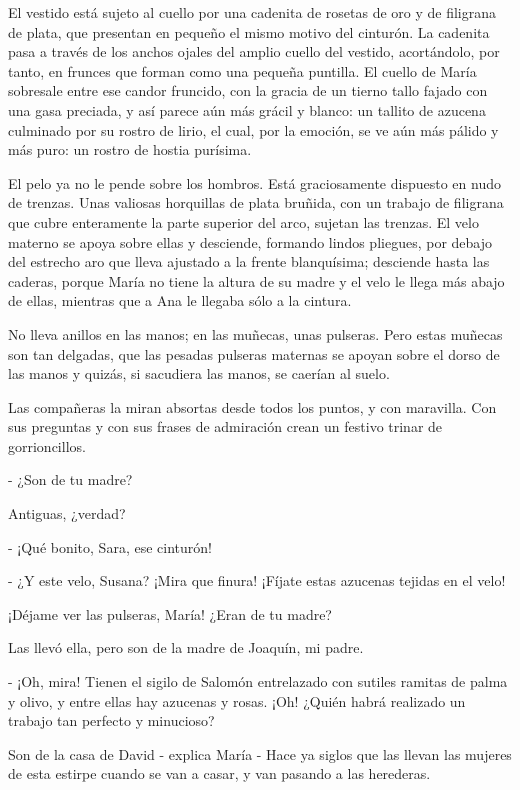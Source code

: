 \documentclass[12pt, twoside, openright]{book} %
\begin{document}
El vestido está sujeto al cuello por una cadenita de rosetas de oro y de filigrana de plata, que presentan en pequeño el mismo motivo del cinturón. La cadenita pasa a través de los anchos ojales del amplio cuello del vestido, acortándolo, por tanto, en frunces que forman como una pequeña puntilla. El cuello de María sobresale entre ese candor fruncido, con la gracia de un tierno tallo fajado con una gasa preciada, y así parece aún más grácil y blanco: un tallito de azucena culminado por su rostro de lirio, el cual, por la emoción, se ve aún más pálido y más puro: un rostro de hostia purísima. 

El pelo ya no le pende sobre los hombros. Está graciosamente dispuesto en nudo de trenzas. Unas valiosas horquillas de plata bruñida, con un trabajo de filigrana que cubre enteramente la parte superior del arco, sujetan las trenzas. El velo materno se apoya sobre ellas y desciende, formando lindos pliegues, por debajo del estrecho aro que lleva ajustado a la frente blanquísima; desciende hasta las caderas, porque María no tiene la altura de su madre y el velo le llega más abajo de ellas, mientras que a Ana le llegaba sólo a la cintura. 

No lleva anillos en las manos; en las muñecas, unas pulseras. Pero estas muñecas son tan delgadas, que las pesadas pulseras maternas se apoyan sobre el dorso de las manos y quizás, si sacudiera las manos, se caerían al suelo. 

Las compañeras la miran absortas desde todos los puntos, y con maravilla. Con sus preguntas y con sus frases de admiración crean un festivo trinar de gorrioncillos. 

- ¿Son de tu madre? 

Antiguas, ¿verdad? 

- ¡Qué bonito, Sara, ese cinturón! 

- ¿Y este velo, Susana? ¡Mira que finura! ¡Fíjate estas azucenas tejidas en el velo! 

¡Déjame ver las pulseras, María! ¿Eran de tu madre? 

Las llevó ella, pero son de la madre de Joaquín, mi padre. 

- ¡Oh, mira! Tienen el sigilo de Salomón entrelazado con sutiles ramitas de palma y olivo, y entre ellas hay azucenas y rosas. ¡Oh! ¿Quién habrá realizado un trabajo tan perfecto y minucioso? 

Son de la casa de David - explica María - Hace ya siglos que las llevan las mujeres de esta estirpe cuando se van a casar, y van pasando a las herederas. 
\end{document}
